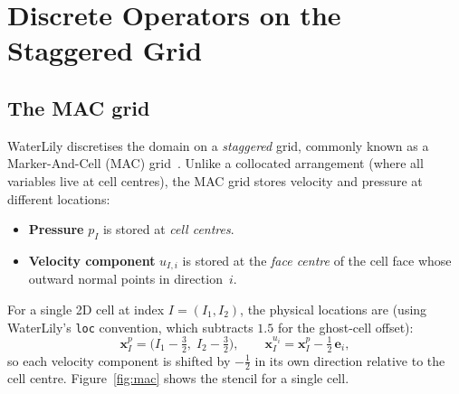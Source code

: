 \documentclass[11pt]{article}
\newcommand{\vect}[1]{\bm{#1}}
\begin{document}
\section{Discrete Operators on the Staggered Grid}

\subsection{The MAC grid}

WaterLily discretises the domain on a \emph{staggered} grid, commonly
known as a Marker-And-Cell (MAC) grid~\cite{Harlow1965}.  Unlike a
collocated arrangement (where all variables live at cell centres), the
MAC grid stores velocity and pressure at different locations:

\begin{itemize}
  \item \textbf{Pressure} $p_I$ is stored at \emph{cell centres}.
  \item \textbf{Velocity component} $u_{I,i}$ is stored at the
    \emph{face centre} of the cell face whose outward normal points in
    direction~$i$.
\end{itemize}

\noindent
For a single 2D cell at index $I=(I_1,I_2)$, the physical locations are
(using WaterLily's \texttt{loc} convention, which subtracts $1.5$ for
the ghost-cell offset):
\begin{equation}\label{eq:loc}
  \vect{x}^{p}_I = \bigl(I_1 - \tfrac{3}{2},\; I_2 - \tfrac{3}{2}\bigr),
  \qquad
  \vect{x}^{u_i}_I = \vect{x}^{p}_I - \tfrac{1}{2}\,\vect{e}_i,
\end{equation}
so each velocity component is shifted by $-\frac{1}{2}$ in its own
direction relative to the cell centre.  Figure~\ref{fig:mac} shows the
stencil for a single cell.
\end{document}
